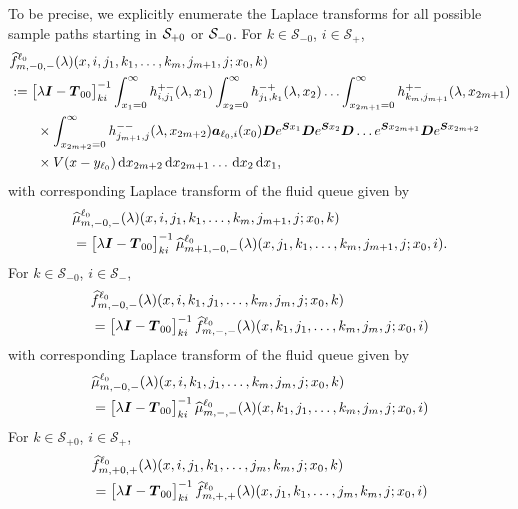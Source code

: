 To be precise, we explicitly enumerate the Laplace transforms for all possible sample paths starting in \(\mathcal{S}_{+0}\) or \(\mathcal{S}_{-0}\). For \(k\in\mathcal S_{-0}\), \(i\in\mathcal S_+\),
\begin{align}
	&\widehat{f}_{m,-0,-}^{\ell_0}(\lambda)(x,i,j_1,k_1,\dots,k_m,j_{m+1},j;x_0,k)\nonumber 
	\\&:=\begin{bmatrix} \lambda \boldsymbol I - \boldsymbol T_{00} \end{bmatrix}^{-1}_{ki}\int_{x_1=0}^\infty h^{+-}_{i,j_{1}}(\lambda,x_1)\nonumber
	\int_{x_2=0}^\infty h^{-+}_{j_1,k_1}(\lambda,x_2)
	\hdots \int_{x_{2m+1}=0}^\infty h^{+-}_{k_{m},j_{m+1}}(\lambda, x_{2m+1}) 
	\\&\qquad \times\int_{x_{2m+2}=0}^\infty h^{--}_{j_{m+1},j}(\lambda,x_{2m+2})
	 \boldsymbol   a_{\ell_0,i}(x_0)\boldsymbol De^{\boldsymbol{S}x_1} \boldsymbol{D} e^{\boldsymbol{S}x_2} \boldsymbol{D}\dots e^{\boldsymbol{S}x_{2m+1}}  \boldsymbol{D}e^{\boldsymbol{S}x_{2m+2}} \nonumber 
	 \\&\qquad{}\times V(x-y_{\ell_0})  \, \mathrm{d} x_{2m+2} \, \mathrm{d} x_{2m+1}\dots\, \mathrm{d} x_2 \, \mathrm{d} x_1,\label{eqn: k0jJ0AAAAA}
\end{align}
with corresponding Laplace transform of the fluid queue given by
\begin{align}
	&\widehat \mu_{m,-0,-}^{\ell_0}(\lambda)(x,i,j_1,k_1,\dots,k_m,j_{m+1},j;x_0,k)\nonumber 
	\\& = \begin{bmatrix} \lambda \boldsymbol I - \boldsymbol T_{00} \end{bmatrix}^{-1}_{ki} \widehat \mu_{m+1,-0,-}^{\ell_0}(\lambda)(x,j_1,k_1,\dots,k_m,j_{m+1},j;x_0,i) .
\end{align}
For \(k\in\mathcal S_{-0}\), \(i\in\mathcal S_-\),
\begin{align}
		&\widehat{f}_{m,-0,-}^{\ell_0}(\lambda)(x,i,k_1,j_1,\dots,k_m,j_m,j;x_0,k)  \nonumber
		\\&=\begin{bmatrix} \lambda \boldsymbol I - \boldsymbol T_{00} \end{bmatrix}^{-1}_{ki}\widehat{f}_{m,-,-}^{\ell_0}(\lambda)(x,k_1,j_1,\dots,k_m,j_m,j;x_0,i)
		\label{eqn: k0jJ0asfc134}
\end{align} 
with corresponding Laplace transform of the fluid queue given by 
\begin{align}
	&\widehat \mu_{m,-0,-}^{\ell_0}(\lambda)(x,i,k_1,j_1,\dots,k_m,j_m,j;x_0,k)\nonumber 
	\\&= \begin{bmatrix} \lambda \boldsymbol I - \boldsymbol T_{00} \end{bmatrix}^{-1}_{ki}\widehat \mu_{m,-,-}^{\ell_0}(\lambda)(x,k_1,j_1,\dots,k_m,j_m,j;x_0,i)
\end{align}
For \(k\in\mathcal S_{+0}\), \(i\in\mathcal S_+\),
\begin{align}
		&\widehat{f}_{m,+0,+}^{\ell_0}(\lambda)(x,i,j_1,k_1,\dots,j_m,k_m,j;x_0,k) \nonumber 
		\\&=\begin{bmatrix} \lambda \boldsymbol I - \boldsymbol T_{00} \end{bmatrix}^{-1}_{ki}\widehat{f}_{m,+,+}^{\ell_0}(\lambda)(x,j_1,k_1,\dots,j_m,k_m,j;x_0,i)
		\label{eqn: k0jJ0asfca134}
\end{align} 

